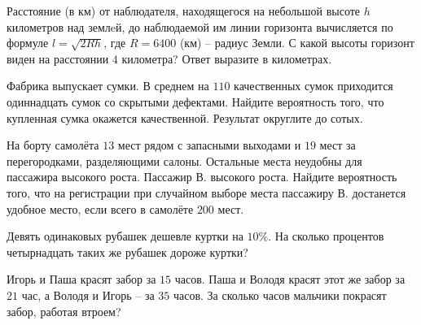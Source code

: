 \begin{class}[number=1]
\begin{listofex}
	\item Расстояние (в км) от наблюдателя, находящегося на небольшой высоте \( h \) километров над землeй, до наблюдаемой им линии горизонта вычисляется по формуле \( l=\sqrt{2Rh} \), где \( R = 6400 \) (км) – радиус Земли. С какой высоты горизонт виден на расстоянии \(4\) километра? Ответ выразите в километрах.
	\item Фабрика выпускает сумки. В среднем на \( 110 \) качественных сумок приходится одиннадцать сумок со скрытыми дефектами. Найдите вероятность того, что купленная сумка окажется качественной. Результат округлите до сотых.
	\item На борту самолёта \( 13 \) мест рядом с запасными выходами и \( 19 \) мест за перегородками, разделяющими салоны. Остальные места неудобны для пассажира высокого роста. Пассажир В. высокого роста. Найдите вероятность того, что на регистрации при случайном выборе места пассажиру В. достанется удобное место, если всего в самолёте \( 200 \) мест.
	\item Девять одинаковых рубашек дешевле куртки на \( 10\% \). На сколько процентов четырнадцать таких же рубашек дороже куртки?
	\item Игорь и Паша красят забор за \( 15 \) часов. Паша и Володя красят этот же забор за \( 21 \) час, а Володя и Игорь – за \( 35 \) часов. За сколько часов мальчики покрасят забор, работая втроем?
\end{listofex}
\end{class}
%
%
%
%
